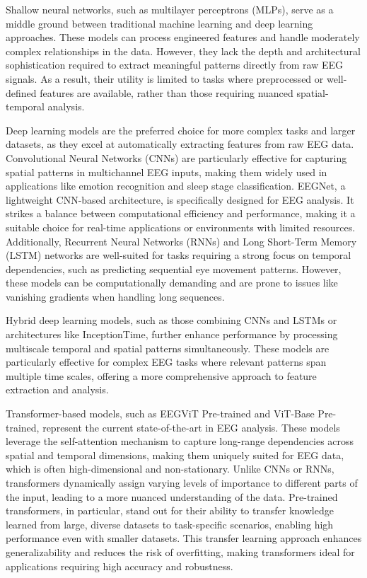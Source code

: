 \documentclass{article}
\begin{document}
Shallow neural networks, such as multilayer perceptrons (MLPs), serve as a middle ground between traditional machine learning and deep learning approaches. These models can process engineered features and handle moderately complex relationships in the data. However, they lack the depth and architectural sophistication required to extract meaningful patterns directly from raw EEG signals. As a result, their utility is limited to tasks where preprocessed or well-defined features are available, rather than those requiring nuanced spatial-temporal analysis.

Deep learning models are the preferred choice for more complex tasks and larger datasets, as they excel at automatically extracting features from raw EEG data. Convolutional Neural Networks (CNNs) are particularly effective for capturing spatial patterns in multichannel EEG inputs, making them widely used in applications like emotion recognition and sleep stage classification. EEGNet, a lightweight CNN-based architecture, is specifically designed for EEG analysis. It strikes a balance between computational efficiency and performance, making it a suitable choice for real-time applications or environments with limited resources. Additionally, Recurrent Neural Networks (RNNs) and Long Short-Term Memory (LSTM) networks are well-suited for tasks requiring a strong focus on temporal dependencies, such as predicting sequential eye movement patterns. However, these models can be computationally demanding and are prone to issues like vanishing gradients when handling long sequences.

Hybrid deep learning models, such as those combining CNNs and LSTMs or architectures like InceptionTime, further enhance performance by processing multiscale temporal and spatial patterns simultaneously. These models are particularly effective for complex EEG tasks where relevant patterns span multiple time scales, offering a more comprehensive approach to feature extraction and analysis.

Transformer-based models, such as EEGViT Pre-trained and ViT-Base Pre-trained, represent the current state-of-the-art in EEG analysis. These models leverage the self-attention mechanism to capture long-range dependencies across spatial and temporal dimensions, making them uniquely suited for EEG data, which is often high-dimensional and non-stationary. Unlike CNNs or RNNs, transformers dynamically assign varying levels of importance to different parts of the input, leading to a more nuanced understanding of the data. Pre-trained transformers, in particular, stand out for their ability to transfer knowledge learned from large, diverse datasets to task-specific scenarios, enabling high performance even with smaller datasets. This transfer learning approach enhances generalizability and reduces the risk of overfitting, making transformers ideal for applications requiring high accuracy and robustness.
\end{document}
